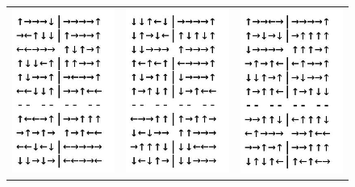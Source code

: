 \documentclass{article}
\begin{document}
\begin{figure}
\begin{tabular}{ccc}
  \includegraphics[scale=0.5]{q_1000_0p05_0p1.jpg} &   \includegraphics[scale=0.5]{q_1000_0p1_0p1.jpg} & \includegraphics[scale=0.5]{q_1000_0p2_0p1.jpg} \\

\end{tabular}
\end{figure}
\end{document}
